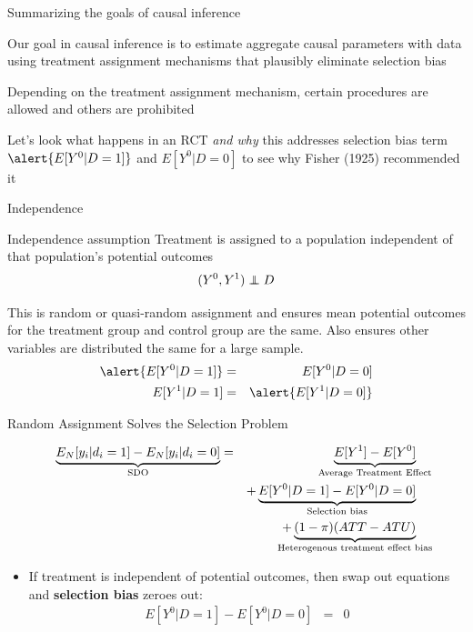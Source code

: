 \documentclass{beamer}
\newcommand\independent{\protect\mathpalette{\protect\independenT}{\perp}}
\def\independenT#1#2{\mathrel{\rlap{$#1#2$}\mkern2mu{#1#2}}}
\begin{document}
\begin{frame}{Summarizing the goals of causal inference}

  Our goal in causal inference is to estimate aggregate causal parameters with data using treatment assignment mechanisms that plausibly eliminate selection bias

  \bigskip

Depending on the treatment assignment mechanism, certain procedures are allowed and others are prohibited

  \bigskip

  Let's look what happens in an RCT \emph{and why} this addresses selection bias term $\alert{E[Y^0|D=1]}$ and $E[Y^0|D=0]$ to see why Fisher (1925) recommended it

\end{frame}


\begin{frame}{Independence}


  \begin{block}{Independence assumption}
    Treatment is assigned to a population independent of that population's potential outcomes  $$(Y^0,Y^1)\independent{D}$$
  \end{block}
  This is random or quasi-random assignment and ensures mean potential outcomes for the treatment group and control group are the same.  Also ensures other variables are distributed the same for a large sample.
  \begin{eqnarray*}
    \alert{E[Y^0|D=1]} &=& E[Y^0 | D=0] \\
    E[Y^1|D=1] &=& \alert{E[Y^1 | D=0]}
  \end{eqnarray*}
\end{frame}

\begin{frame}{Random Assignment Solves the Selection Problem}

  \begin{eqnarray*}
    \underbrace{E_N[y_i | d_i=1] - E_N[y_i | d_i=0]}_{ \mathclap{\text{SDO}}}&=& \underbrace{E[Y^1] - E[Y^0]}_{ \mathclap{\text{Average Treatment Effect}}} \\
    &&+ \underbrace{E[Y^0|D=1] - E[Y^0 | D=0]}_{ \mathclap{\text{Selection bias}}}  \\
    && + \underbrace{(1-\pi)(ATT - ATU)}_{ \mathclap{\text{Heterogenous treatment effect bias}}}
  \end{eqnarray*}


  \begin{itemize}
    \item If treatment is independent of potential outcomes, then swap out equations and \textbf{selection bias} zeroes out:
          \begin{eqnarray*}
            E[Y^0 | D=1] - E[Y^0 | D=0] &=& 0
          \end{eqnarray*}
  \end{itemize}

\end{frame}
\end{document}
